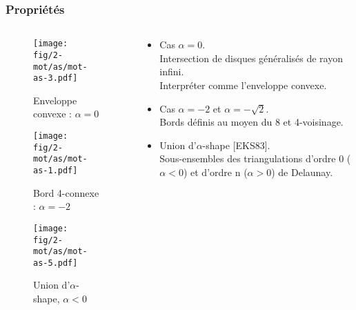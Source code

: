 
\begin{frame}
\frametitle{Propriétés}
\begin{columns}[t]
  \begin{column}{0.5\linewidth}
    {
      \begin{figure}[H]
        \centering
        \texttt{[image: fig/2-mot/as/mot-as-3.pdf]}
        \caption{Enveloppe convexe : $\alpha = 0$}
      \end{figure}
    }
    {
      \begin{figure}[H]
        \centering
        \texttt{[image: fig/2-mot/as/mot-as-1.pdf]}
        \caption{Bord 4-connexe : $\alpha = -2$}
      \end{figure}
    }
    {
      \begin{figure}[H]
        \centering
        \texttt{[image: fig/2-mot/as/mot-as-5.pdf]}
        \caption{Union d'$\alpha$-shape, $\alpha < 0$}
      \end{figure}
    }  
  
  \end{column}
  \begin{column}{0.5\linewidth}
    \begin{block}{}
      \begin{itemize}
        \item<1-> Cas $\alpha = 0$.\\
        Intersection de disques généralisés de rayon infini.\\
        Interpréter comme l'enveloppe convexe.
        \item<2-> Cas $\alpha = -2$ et $\alpha = -\sqrt{2}$.\\
        Bords définis au moyen du 8 et 4-voisinage.
        \item<3-> Union d'$\alpha$-shape [EKS83].\\
        Sous-ensembles des triangulations d’ordre 0 ($\alpha < 0$) et d’ordre n ($\alpha > 0$) de Delaunay.
      \end{itemize}
    \end{block} 
  \end{column}
\end{columns}


\end{frame}

